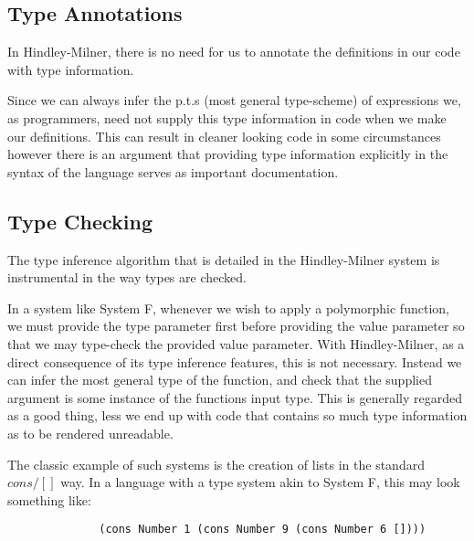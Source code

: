 \documentclass{ProgressReport}[2020/09/15]
\begin{document}
            \subsection{Type Annotations}
            
            In Hindley-Milner, there is no need for us to annotate the definitions
            in our code with type information.
            
            Since we can always infer the p.t.s (most general type-scheme) of
            expressions we, as programmers, need not supply this type information
            in code when we make our definitions. This can result in cleaner
            looking code in some circumstances however there is an argument that
            providing type information explicitly in the syntax of the language
            serves as important documentation.
            
            \subsection{Type Checking}
            
            The type inference algorithm that is detailed in the Hindley-Milner
            system is instrumental in the way types are checked.
            
            In a system like System F, whenever we wish to apply a polymorphic
            function, we must provide the type parameter first before providing
            the value parameter so that we may type-check the provided value
            parameter. With Hindley-Milner, as a direct consequence of its type
            inference features, this is not necessary. Instead we can infer the
            most general type of the function, and check that the supplied
            argument is some instance of the functions input type. This is
            generally regarded as a good thing, less we end up with code that
            contains so much type information as to be rendered unreadable.
            
            The classic example of such systems is the creation of lists in the
            standard $cons/[]$ way. In a language with a type system akin to
            System F, this may look
            something like:
            
            \begin{verbatim}
              (cons Number 1 (cons Number 9 (cons Number 6 [])))  
            \end{verbatim}
            
\end{document}
